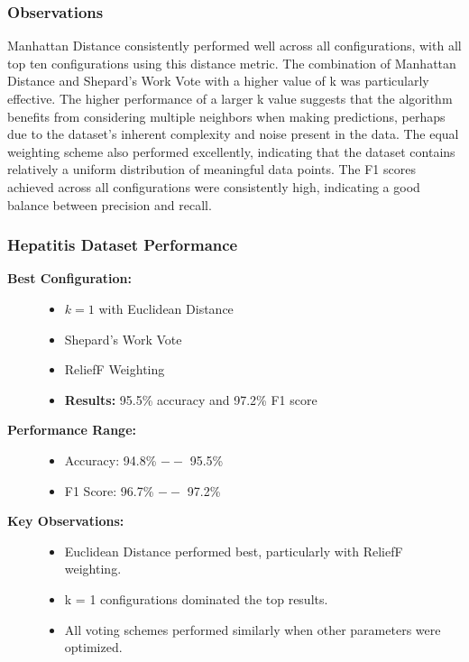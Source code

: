 \subsubsection*{Observations}
Manhattan Distance consistently performed well across all configurations, with all top ten configurations using this distance metric.
The combination of Manhattan Distance and Shepard's Work Vote with a higher value of k was particularly effective. 
The higher performance of a larger k value suggests that the algorithm benefits from considering multiple neighbors when making predictions, perhaps
due to the dataset's inherent complexity and noise present in the data. The equal weighting scheme also performed excellently,
indicating that the dataset contains relatively a uniform
distribution of meaningful data points.
The F1 scores achieved across all configurations were consistently high, indicating a good balance between precision and recall.


\subsubsection{Hepatitis Dataset Performance}

\begin{description}
    \item[\textbf{Best Configuration:}]\leavevmode
        \begin{itemize}
            \item $k = 1$ with Euclidean Distance
            \item Shepard's Work Vote
            \item ReliefF Weighting
            \item \textbf{Results:} 95.5\% accuracy and 97.2\% F1 score
        \end{itemize}
    
    \item[\textbf{Performance Range:}]\leavevmode
        \begin{itemize}
            \item Accuracy: 94.8\% $--$ 95.5\%
            \item F1 Score: 96.7\% $--$ 97.2\%
        \end{itemize}
    
    \item[\textbf{Key Observations:}]\leavevmode
        \begin{itemize}
            \item Euclidean Distance performed best, particularly with ReliefF weighting.
            \item k = 1 configurations dominated the top results.
            \item All voting schemes performed similarly when other parameters were optimized.
        \end{itemize}
\end{description}

